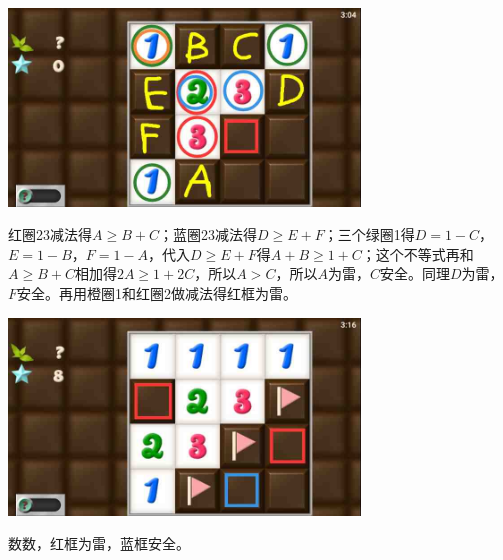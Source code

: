 \subsection{} %
\begin{center}
    \includegraphics[width=0.7\textwidth]{puzzlelow/154-1.jpg}
\end{center}
红圈23减法得$A\ge B+C$；蓝圈23减法得$D\ge E+F$；三个绿圈1得$D=1-C$，$E=1-B$，$F=1-A$，代入$D\ge E+F$得$A+B\ge 1+C$；这个不等式再和$A\ge B+C$相加得$2A\ge 1+2C$，所以$A>C$，所以$A$为雷，$C$安全。同理$D$为雷，$F$安全。再用橙圈1和红圈2做减法得红框为雷。
\begin{center}
    \includegraphics[width=0.7\textwidth]{puzzlelow/154-2.jpg}
\end{center}
数数，红框为雷，蓝框安全。

